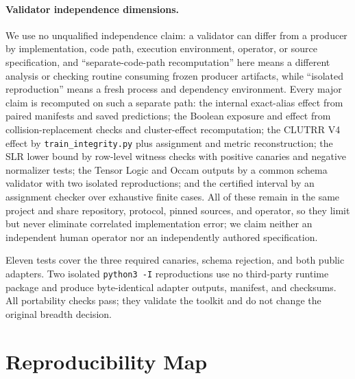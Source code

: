\paragraph{Validator independence dimensions.}
We use no unqualified independence claim: a validator can differ from a
producer by implementation, code path, execution environment, operator, or
source specification, and ``separate-code-path recomputation'' here means a
different analysis or checking routine consuming frozen producer artifacts,
while ``isolated reproduction'' means a fresh process and dependency
environment.  Every major claim is recomputed on such a separate path: the
internal exact-alias effect from paired manifests and saved predictions; the
Boolean exposure and effect from collision-replacement checks and
cluster-effect recomputation; the CLUTRR V4 effect by
\texttt{train\_integrity.py} plus assignment and metric reconstruction; the
SLR lower bound by row-level witness checks with positive canaries and
negative normalizer tests; the Tensor Logic and Occam outputs by a common
schema validator with two isolated reproductions; and the certified interval
by an assignment checker over exhaustive finite cases.  All of these remain
in the same project and share repository, protocol, pinned sources, and
operator, so they limit but never eliminate correlated implementation error;
we claim neither an independent human operator nor an independently authored
specification.

Eleven tests cover the three required canaries, schema rejection, and both
public adapters.  Two isolated \texttt{python3 -I} reproductions use no
third-party runtime package and produce byte-identical adapter outputs,
manifest, and checksums.  All portability checks pass; they validate the
toolkit and do not change the original breadth decision.

\section{Reproducibility Map}
\label{app:repro}

